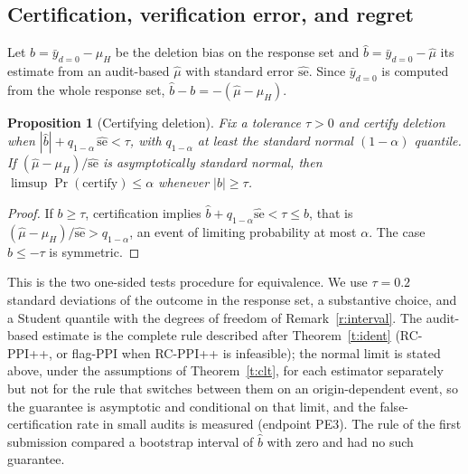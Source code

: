 \documentclass[11pt]{article}
\newtheorem{proposition}{Proposition}
\theoremstyle{definition}
\newcommand{\muH}{\mu_H}
\begin{document}
\subsection{Certification, verification error, and regret}\label{sec:cert}
Let $b=\bar y_{d=0}-\muH$ be the deletion bias on the response set and
$\hat b=\bar y_{d=0}-\hat\mu$ its estimate from an audit-based $\hat\mu$ with standard error
$\widehat{\mathrm{se}}$. Since $\bar y_{d=0}$ is computed from the whole response set,
$\hat b-b=-(\hat\mu-\muH)$.

\begin{proposition}[Certifying deletion]\label{p:tost}
Fix a tolerance $\tau>0$ and certify deletion when
$|\hat b|+q_{1-\alpha}\,\widehat{\mathrm{se}}<\tau$, with $q_{1-\alpha}$ at least the
standard normal $(1-\alpha)$ quantile. If $(\hat\mu-\muH)/\widehat{\mathrm{se}}$ is
asymptotically standard normal, then $\limsup\Pr(\text{certify})\le\alpha$ whenever
$|b|\ge\tau$.
\end{proposition}
\begin{proof}
If $b\ge\tau$, certification implies $\hat b+q_{1-\alpha}\widehat{\mathrm{se}}<\tau\le b$, that
is $(\hat\mu-\muH)/\widehat{\mathrm{se}}>q_{1-\alpha}$, an event of limiting probability at most
$\alpha$. The case $b\le-\tau$ is symmetric.
\end{proof}
This is the two one-sided tests procedure for equivalence. We use $\tau=0.2$ standard
deviations of the outcome in the response set, a substantive choice, and a Student
quantile with the degrees of freedom of Remark~\ref{r:interval}. The audit-based estimate
is the complete rule described after Theorem~\ref{t:ident} (RC-PPI++, or flag-PPI when
RC-PPI++ is infeasible); the normal limit is stated above, under the assumptions of
Theorem~\ref{t:clt}, for each estimator separately but not for the rule that switches between them on an origin-dependent event,
so the guarantee is asymptotic and conditional on that limit, and the false-certification
rate in small audits is measured (endpoint PE3). The rule of the first submission compared
a bootstrap interval of $\hat b$ with zero and had no such guarantee.
\end{document}
